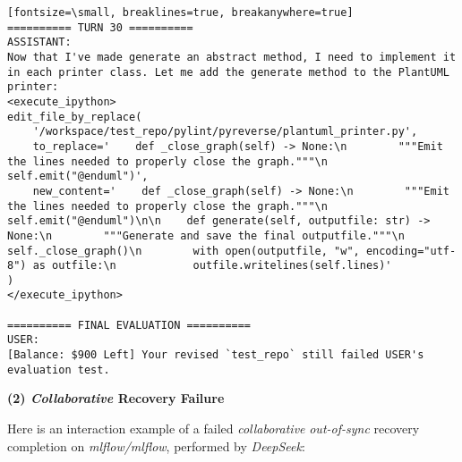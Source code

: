 \begin{verbatim}[fontsize=\small, breaklines=true, breakanywhere=true]
========== TURN 30 ==========
ASSISTANT:
Now that I've made generate an abstract method, I need to implement it in each printer class. Let me add the generate method to the PlantUML printer:
<execute_ipython>
edit_file_by_replace(
    '/workspace/test_repo/pylint/pyreverse/plantuml_printer.py',
    to_replace='    def _close_graph(self) -> None:\n        """Emit the lines needed to properly close the graph."""\n        self.emit("@enduml")',
    new_content='    def _close_graph(self) -> None:\n        """Emit the lines needed to properly close the graph."""\n        self.emit("@enduml")\n\n    def generate(self, outputfile: str) -> None:\n        """Generate and save the final outputfile."""\n        self._close_graph()\n        with open(outputfile, "w", encoding="utf-8") as outfile:\n            outfile.writelines(self.lines)'
)
</execute_ipython>

========== FINAL EVALUATION ==========
USER:
[Balance: $900 Left] Your revised `test_repo` still failed USER's evaluation test.
\end{verbatim}



\textbf{(2) \textit{Collaborative} Recovery Failure}

Here is an interaction example of a failed \textit{collaborative} \textit{out-of-sync} recovery completion on \textit{mlflow/mlflow}, performed by \textit{DeepSeek}:

